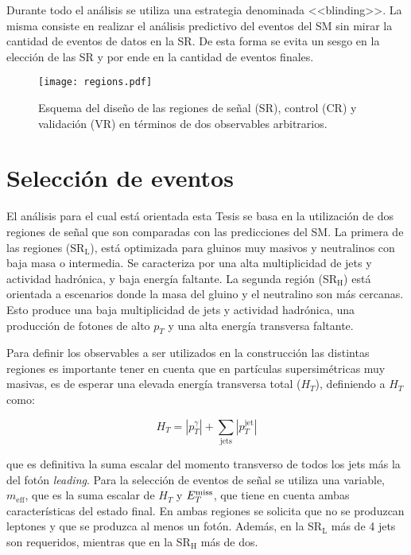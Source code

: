 Durante todo el análisis se utiliza una estrategia denominada <<blinding>>. La misma consiste en realizar el análisis predictivo del eventos del SM sin mirar la cantidad de eventos de datos en la SR. De esta forma se evita un sesgo en la elección de las SR y por ende en la cantidad de eventos finales.

\begin{figure}
\centering
\texttt{[image: regions.pdf]}
\caption{Esquema del diseño de las regiones de señal (SR), control (CR) y validación (VR) en términos de dos observables arbitrarios.}
\label{regions}
\end{figure}

\section{Selección de eventos}

El análisis para el cual está orientada esta Tesis \cite{Collaboration:2198651} se basa en la utilización de dos regiones de señal que son comparadas con las predicciones del SM. La primera de las regiones (SR$_{\text{L}}$), está optimizada para gluinos muy masivos y neutralinos con baja masa o intermedia. Se caracteriza por una alta multiplicidad de jets y actividad hadrónica, y baja energía faltante. La segunda región (SR$_{\text{H}}$) está orientada a escenarios donde la masa del gluino y el neutralino son más cercanas. Esto produce una baja multiplicidad de jets y actividad hadrónica, una producción de fotones de alto $p_{T}$ y una alta energía transversa faltante.

Para definir los observables a ser utilizados en la construcción las distintas regiones es importante tener en cuenta que en partículas supersimétricas muy masivas, es de esperar una elevada energía transversa total ($H_{T}$), definiendo a $H_{T}$ como:

\begin{equation}
H_{T}=|p_{T}^{\gamma}|+\sum_{\text{jets}}|p_{T}^{\text{jet}}|
\end{equation} 

\noindent
que es definitiva la suma escalar del momento transverso de todos los jets más la del fotón \textit{leading}. Para la selección de eventos de señal se utiliza una variable, $m_{\text{eff}}$, que es la suma escalar de $H_{T}$ y $E_{T}^{\text{miss}}$, que tiene en cuenta ambas características del estado final. En ambas regiones se solicita que no se produzcan leptones y que se produzca al menos un fotón. Además, en la SR$_{\text{L}}$ más de 4 jets son requeridos, mientras que en la SR$_{\text{H}}$ más de dos.

